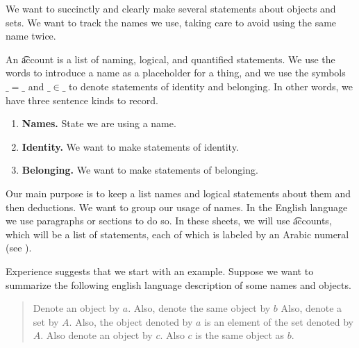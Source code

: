 

We want to succinctly and clearly make several statements about objects and sets. We want to track the names we use, taking care to avoid using the same name twice.


An \t{account} is a list of naming, logical, and quantified statements.
We use the words  to introduce a name as a placeholder for a thing, and we use the symbols $\_=\_$ and $\_\in\_$ to denote statements of identity and belonging.
In other words, we have three sentence kinds to record.

\begin{enumerate}

  \item
  \textbf{Names.}
  State we are using a name.

  \item
  \textbf{Identity.}
  We want to make statements of identity.

  \item
  \textbf{Belonging.}
  We want to make statements of belonging.

\end{enumerate}

Our main purpose is to keep a list names and logical statements about them and then deductions.
We want to group our usage of names.
In the English language we use paragraphs or sections to do so.
In these sheets, we will use \t{accounts}, which will be a list of statements, each of which is labeled by an Arabic numeral (see ).

Experience suggests that we start with an example.
Suppose we want to summarize the following english language description of some names and objects.

\begin{quote}
Denote an object by $a$.
Also, denote the same object by $b$
Also, denote a set by $A$.
Also, the object denoted by $a$ is an element of the set denoted by $A$.
Also denote an object by $c$.
Also $c$ is the same object as $b$.
\end{quote}

